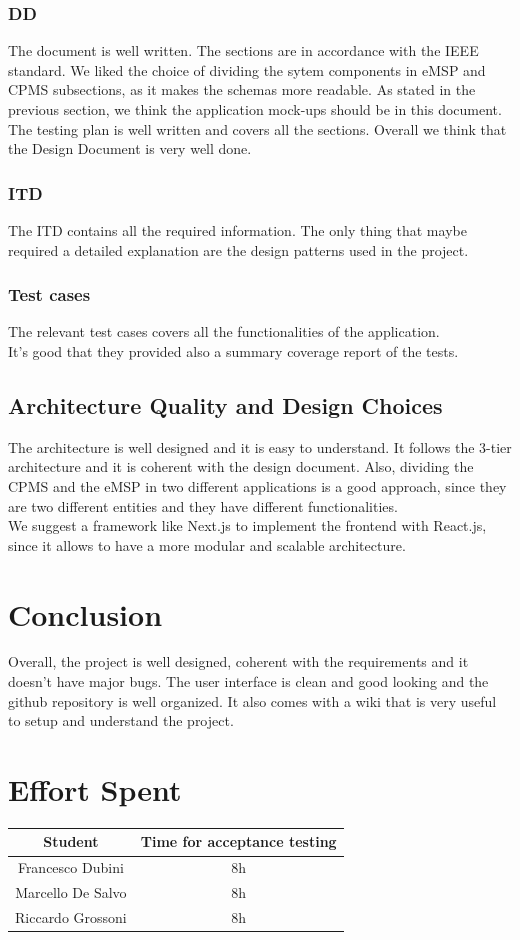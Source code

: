 \documentclass[table, 12pt]{article}
\begin{document}
\subsubsection{DD}
The document is well written. The sections are in accordance with the IEEE standard. We liked the choice of dividing the sytem components in eMSP and CPMS subsections, as it makes the schemas more readable. As stated in the previous section, we think the application mock-ups should be in this document.
The testing plan is well written and covers all the sections.
Overall we think that the Design Document is very well done.

\subsubsection{ITD}
The ITD contains all the required information. 
The only thing that maybe required a detailed explanation are the design patterns used in the project.
\subsubsection*{Test cases}
The relevant test cases covers all the functionalities of the application.\\
It's good that they provided also a summary coverage report of the tests.

\newpage
\subsection{Architecture Quality and Design Choices}
The architecture is well designed and it is easy to understand. 
It follows the 3-tier architecture and it is coherent with the design document.
Also, dividing the CPMS and the eMSP in two different applications is a good approach, since they are two different entities and they have different functionalities.\\
We suggest a framework like Next.js to implement the frontend with React.js, since it allows to have a more modular and scalable architecture.

\section{Conclusion}
Overall, the project is well designed, coherent with the requirements and it doesn't have major bugs.
The user interface is clean and good looking and the github repository is well organized. It also comes with a wiki that is very useful to setup and understand the project.


\section{Effort Spent}
\begin{tabular}{|c||c|}
    \hline
    Student & Time for acceptance testing\\ \hline
    Francesco Dubini & 8h \\
    Marcello De Salvo & 8h\\
    Riccardo Grossoni & 8h \\
    \hline
\end{tabular}
\end{document}

